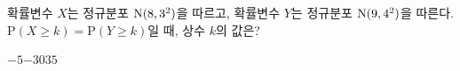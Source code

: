 확률변수 $X$는 정규분포 $\mathrm{N}(8{,}\mkern3mu\mathopen{}3^2)$을 따르고, 확률변수 $Y$는 정규분포 $\mathrm{N}(9{,}\mkern3mu\mathopen{}4^2)$을 따른다. $\mathrm{P}(X\ge k)=\mathrm{P}(Y\ge k)$일 때, 상수 $k$의 값은?
\begin{choices32}{$-5$}{$-3$}{$0$}{$3$}{$5$}\end{choices32}
